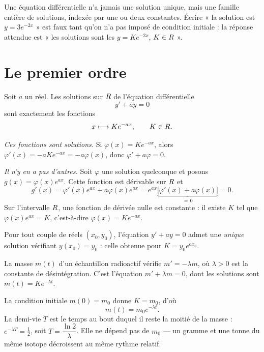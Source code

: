 \begin{avertissement}
Une équation différentielle n'a jamais une solution unique, mais une famille
entière de solutions, indexée par une ou deux constantes. Écrire « la solution
est $y = 3e^{-2x}$ » est faux tant qu'on n'a pas imposé de condition
initiale : la réponse attendue est « les solutions sont les
$y = Ke^{-2x}$, $K \in R$ ».
\end{avertissement}

\section{Le premier ordre}

\begin{theoreme}[équation $y' + ay = 0$]
Soit $a$ un réel. Les solutions sur $R$ de l'équation différentielle
\[
  y' + ay = 0
\]
sont exactement les fonctions
\[
  x \longmapsto K e^{-ax}, \qquad K \in R .
\]
\end{theoreme}

\begin{demonstration}
\emph{Ces fonctions sont solutions.} Si $\varphi(x) = Ke^{-ax}$, alors
$\varphi'(x) = -aKe^{-ax} = -a\varphi(x)$, donc $\varphi'+a\varphi = 0$.

\smallskip
\emph{Il n'y en a pas d'autres.} Soit $\varphi$ une solution quelconque et
posons $g(x) = \varphi(x)e^{ax}$. Cette fonction est dérivable sur $R$ et
\[
  g'(x) = \varphi'(x)e^{ax} + a\varphi(x)e^{ax}
        = e^{ax}\underbrace{\bigl[\varphi'(x)+a\varphi(x)\bigr]}_{=\,0} = 0 .
\]
Sur l'intervalle $R$, une fonction de dérivée nulle est constante : il existe
$K$ tel que $\varphi(x)e^{ax} = K$, c'est-à-dire $\varphi(x) = Ke^{-ax}$.
\end{demonstration}


\begin{propriete}
Pour tout couple de réels $(x_{0}, y_{0})$, l'équation $y'+ay = 0$ admet une
\emph{unique} solution vérifiant $y(x_{0}) = y_{0}$ : celle obtenue pour
$K = y_{0}e^{ax_{0}}$.
\end{propriete}

\begin{exemple}
La masse $m(t)$ d'un échantillon radioactif vérifie $m' = -\lambda m$, où
$\lambda>0$ est la constante de désintégration. C'est l'équation
$m' + \lambda m = 0$, dont les solutions sont $m(t) = Ke^{-\lambda t}$.

La condition initiale $m(0) = m_{0}$ donne $K = m_{0}$, d'où
\[
  m(t) = m_{0}e^{-\lambda t}.
\]
La demi-vie $T$ est le temps au bout duquel il reste la moitié de la masse :
$e^{-\lambda T} = \tfrac12$, soit $T = \dfrac{\ln 2}{\lambda}$. Elle ne dépend
pas de $m_{0}$ — un gramme et une tonne du même isotope décroissent au même
rythme relatif.
\end{exemple}

